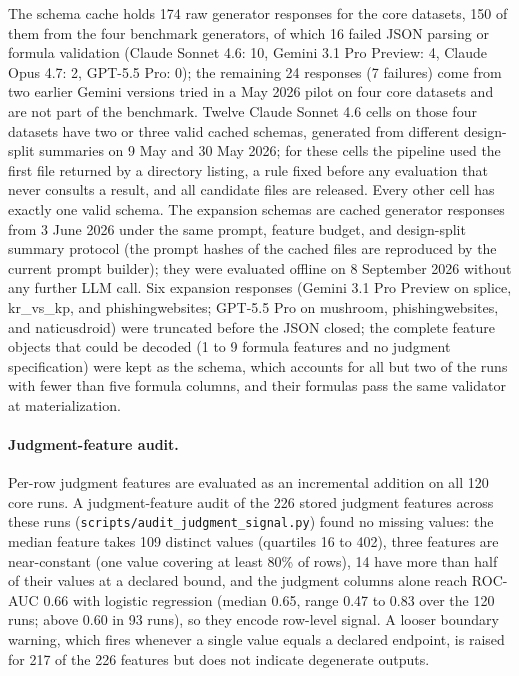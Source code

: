 The schema cache holds 174 raw generator responses for the core datasets, 150 of them from the four benchmark generators, of which 16 failed JSON parsing or formula validation (Claude Sonnet 4.6: 10, Gemini 3.1 Pro Preview: 4, Claude Opus 4.7: 2, GPT-5.5 Pro: 0); the remaining 24 responses (7 failures) come from two earlier Gemini versions tried in a May 2026 pilot on four core datasets and are not part of the benchmark. Twelve Claude Sonnet 4.6 cells on those four datasets have two or three valid cached schemas, generated from different design-split summaries on 9 May and 30 May 2026; for these cells the pipeline used the first file returned by a directory listing, a rule fixed before any evaluation that never consults a result, and all candidate files are released. Every other cell has exactly one valid schema. The expansion schemas are cached generator responses from 3 June 2026 under the same prompt, feature budget, and design-split summary protocol (the prompt hashes of the cached files are reproduced by the current prompt builder); they were evaluated offline on 8 September 2026 without any further LLM call. Six expansion responses (Gemini 3.1 Pro Preview on splice, kr\_vs\_kp, and phishingwebsites; GPT-5.5 Pro on mushroom, phishingwebsites, and naticusdroid) were truncated before the JSON closed; the complete feature objects that could be decoded (1 to 9 formula features and no judgment specification) were kept as the schema, which accounts for all but two of the runs with fewer than five formula columns, and their formulas pass the same validator at materialization.

\paragraph{Judgment-feature audit.}

Per-row judgment features are evaluated as an incremental addition on all 120 core runs. A judgment-feature audit of the 226 stored judgment features across these runs (\texttt{scripts/audit\_judgment\_signal.py}) found no missing values: the median feature takes 109 distinct values (quartiles 16 to 402), three features are near-constant (one value covering at least 80\% of rows), 14 have more than half of their values at a declared bound, and the judgment columns alone reach ROC-AUC 0.66 with logistic regression (median 0.65, range 0.47 to 0.83 over the 120 runs; above 0.60 in 93 runs), so they encode row-level signal. A looser boundary warning, which fires whenever a single value equals a declared endpoint, is raised for 217 of the 226 features but does not indicate degenerate outputs.

